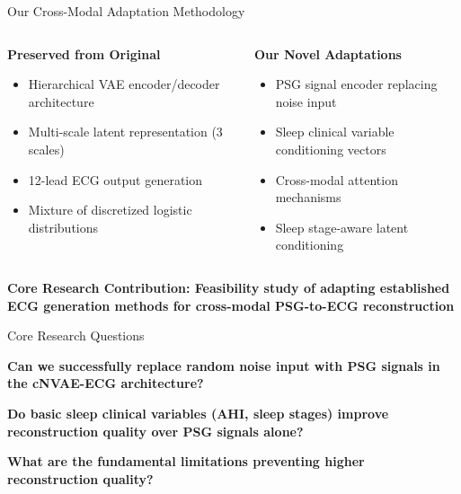 \documentclass[aspectratio=169,11pt]{beamer}
\newcommand{\highlightbox}[2][tcairemred]{%
  \begin{center}
    \colorbox{#1!20}{\parbox{0.9\textwidth}{\centering\textcolor{#1}{\textbf{#2}}}}
  \end{center}}
\begin{document}
\begin{frame}{Our Cross-Modal Adaptation Methodology}
  \begin{columns}[T]
    \begin{column}{0.5\textwidth}
      \textbf{\textcolor{tcairemblue}{Preserved from Original}}
      \begin{itemize}
        \tiny
        \item Hierarchical VAE encoder/decoder architecture
        \item Multi-scale latent representation (3 scales)
        \item 12-lead ECG output generation
        \item Mixture of discretized logistic distributions
      \end{itemize}
    \end{column}
    \begin{column}{0.5\textwidth}
      \textbf{\textcolor{tcairemred}{Our Novel Adaptations}}
      \begin{itemize}
        \tiny
        \item PSG signal encoder replacing noise input
        \item Sleep clinical variable conditioning vectors
        \item Cross-modal attention mechanisms
        \item Sleep stage-aware latent conditioning
      \end{itemize}
    \end{column}
  \end{columns}
  
  \highlightbox[tcairemred]{Core Research Contribution: Feasibility study of adapting established ECG generation methods for cross-modal PSG-to-ECG reconstruction}
\end{frame}

\begin{frame}{Core Research Questions}
  
      \colorbox{tcairemblue!15}{\parbox{0.95\textwidth}{
    \large
    \textcolor{tcairemblue}{\textbf{Can we successfully replace random noise input with PSG signals in the cNVAE-ECG architecture?}}\\
  }}
  
      \colorbox{tcairemorange!15}{\parbox{0.95\textwidth}{
    \large
    \textcolor{tcairemorange}{\textbf{Do basic sleep clinical variables (AHI, sleep stages) improve reconstruction quality over PSG signals alone?}}\\
}}
    \colorbox{tcairemgreen!15}{\parbox{0.95\textwidth}{
    \large
    \textcolor{tcairemgreen}{\textbf{What are the fundamental limitations preventing higher reconstruction quality?}}


  }}

\end{frame}
\end{document}

